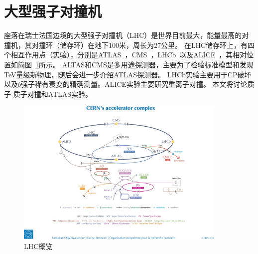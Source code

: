 \section{大型强子对撞机} \label{sec:LHC}
座落在瑞士法国边境的大型强子对撞机（LHC）是世界目前最大，能量最高的对撞机，其对撞环（储存环）在地下100米，周长为27公里。
在LHC储存环上，有四个相互作用点（实验），分别是ATLAS~\cite{ATLAS_Collaboration_2008}，CMS~\cite{CMS_Collaboration_2008}，LHCb~\cite{LHCb_Collaboration_2008}以及ALICE~\cite{ALICE_Collaboration_2008}，其相对位置如简图~\ref{fig:LHC_schematic}所示。
ALTAS和CMS是多用途探测器，主要为了检验标准模型和发现TeV量级新物理，随后会进一步介绍ATLAS探测器。
LHCb实验主要用于CP破坏以及$b$强子稀有衰变的精确测量。ALICE实验主要研究重离子对撞。
本文将讨论质子-质子对撞和ATLAS实验。
\begin{figure}[h]
\begin{center}
\includegraphics[width = 0.9\textwidth,angle=-90]{fig/LHC-shematic.jpg}
\caption{LHC概览} \label{fig:LHC_schematic}
\end{center}
\end{figure}


